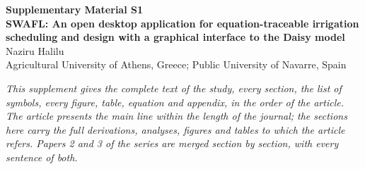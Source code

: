\documentclass[preprint,12pt]{elsarticle}
\begin{document}
\renewcommand{\thesection}{S\arabic{section}}\renewcommand{\thefigure}{S\arabic{figure}}\renewcommand{\thetable}{S\arabic{table}}\renewcommand{\theequation}{S\arabic{equation}}
\begin{center}{\Large\bfseries Supplementary Material S1}\\[6pt]{\large\bfseries SWAFL: An open desktop application for equation-traceable irrigation scheduling and design with a graphical interface to the Daisy model}\\[8pt]Naziru Halilu\\[2pt]{\small Agricultural University of Athens, Greece; Public University of Navarre, Spain}\end{center}
\noindent\textit{This supplement gives the complete text of the study, every section, the list of symbols, every figure, table, equation and appendix, in the order of the article. The article presents the main line within the length of the journal; the sections here carry the full derivations, analyses, figures and tables to which the article refers. Papers 2 and 3 of the series are merged section by section, with every sentence of both.}
\bigskip
\end{document}
